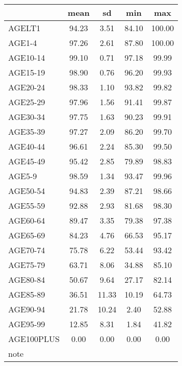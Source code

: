 \begin{tabular}{l*{1}{cccc}}
\toprule
            &        mean&          sd&         min&         max\\
\midrule
AGELT1      &       94.23&        3.51&       84.10&      100.00\\
AGE1-4      &       97.26&        2.61&       87.80&      100.00\\
AGE10-14    &       99.10&        0.71&       97.18&       99.99\\
AGE15-19    &       98.90&        0.76&       96.20&       99.93\\
AGE20-24    &       98.33&        1.10&       93.82&       99.82\\
AGE25-29    &       97.96&        1.56&       91.41&       99.87\\
AGE30-34    &       97.75&        1.63&       90.23&       99.91\\
AGE35-39    &       97.27&        2.09&       86.20&       99.70\\
AGE40-44    &       96.61&        2.24&       85.30&       99.50\\
AGE45-49    &       95.42&        2.85&       79.89&       98.83\\
AGE5-9      &       98.59&        1.34&       93.47&       99.96\\
AGE50-54    &       94.83&        2.39&       87.21&       98.66\\
AGE55-59    &       92.88&        2.93&       81.68&       98.30\\
AGE60-64    &       89.47&        3.35&       79.38&       97.38\\
AGE65-69    &       84.23&        4.76&       66.53&       95.17\\
AGE70-74    &       75.78&        6.22&       53.44&       93.42\\
AGE75-79    &       63.71&        8.06&       34.88&       85.10\\
AGE80-84    &       50.67&        9.64&       27.17&       82.14\\
AGE85-89    &       36.51&       11.33&       10.19&       64.73\\
AGE90-94    &       21.78&       10.24&        2.40&       52.88\\
AGE95-99    &       12.85&        8.31&        1.84&       41.82\\
AGE100PLUS  &        0.00&        0.00&        0.00&        0.00\\
\bottomrule
\multicolumn{5}{l}{\footnotesize note}\\
\end{tabular}

